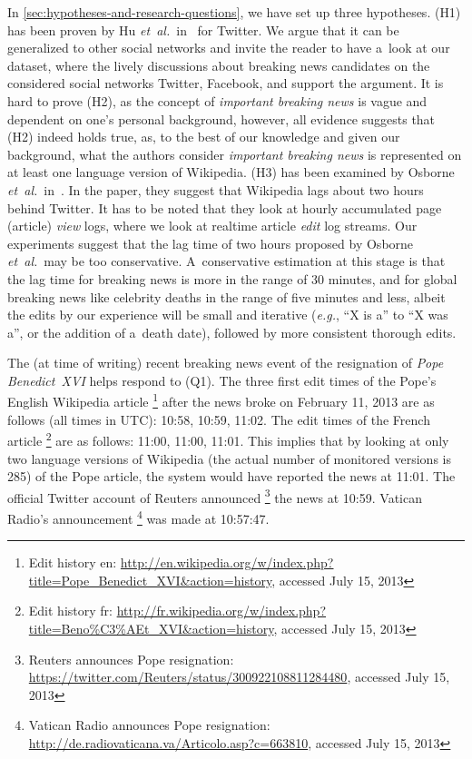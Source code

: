 In \autoref{sec:hypotheses-and-research-questions},
we have set up three hypotheses.
(H1) has been proven by Hu \emph{et~al.}\ in~\cite{hu2012breakingnews} for Twitter.
We argue that it can be generalized to other social networks
and invite the reader to have a~look at our dataset,
where the lively discussions about breaking news candidates
on the considered social networks Twitter, Facebook, and \googleplus
support the argument.
It is hard to prove (H2), as the concept of \emph{important breaking news}
is vague and dependent on one's personal background, however,
all evidence suggests that (H2) indeed holds true,
as, to the best of our knowledge and given our background,
what the authors consider \emph{important breaking news}
is represented on at least one language version of Wikipedia.
(H3) has been examined by Osborne \emph{et~al.}\ in~\cite{osborne2012bieber}.
In the paper, they suggest that Wikipedia lags about two hours behind Twitter.
It has to be noted that they look at hourly accumulated page (article) \emph{view} logs,
where we look at realtime article \emph{edit} log streams.
Our experiments suggest that the lag time of two hours
proposed by Osborne \emph{et~al.}\ may be too conservative. 
A~conservative estimation at this stage is that the lag time
for breaking news is more in the range of 30 minutes,
and for global breaking news like celebrity deaths
in the range of five minutes and less,
albeit the edits by our experience will be small and iterative
(\emph{e.g.}, ``X is a'' to ``X was a'', or the addition of a~death date),
followed by more consistent thorough edits.

The (at time of writing) recent breaking news event
of the resignation of \emph{Pope Benedict~XVI} helps respond to (Q1).
The three first edit times of the Pope's English Wikipedia article%
\footnote{Edit history en: \url{http://en.wikipedia.org/w/index.php?title=Pope_Benedict_XVI&action=history},
accessed July 15, 2013}
after the news broke on February 11, 2013 are as follows
(all times in UTC): 10:58, 10:59, 11:02.
The edit times of the French article%
\footnote{Edit history fr: \url{http://fr.wikipedia.org/w/index.php?title=Beno\%C3\%AEt_XVI&action=history}, accessed July 15, 2013}
are as follows: 11:00, 11:00, 11:01.
This implies that by looking at only two language versions of Wikipedia
(the actual number of monitored versions is 285) of the Pope article,
the system would have reported the news at 11:01.
The official Twitter account of Reuters announced%
\footnote{Reuters announces Pope resignation: \url{https://twitter.com/Reuters/status/300922108811284480},
accessed July 15, 2013} the news at 10:59.
Vatican Radio's announcement%
\footnote{Vatican Radio announces Pope resignation: \url{http://de.radiovaticana.va/Articolo.asp?c=663810},
accessed July 15, 2013} was made at 10:57:47.

